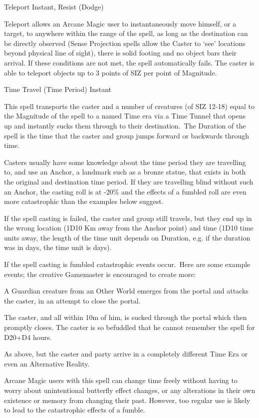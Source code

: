 \begin{rpg-spell}
{Teleport}
{Instant, Resist (Dodge)}

Teleport allows an Arcane Magic user to instantaneously move himself, or a target, to anywhere within the range of the spell, as long as the destination can be directly observed (Sense Projection spells allow the Caster to ‘see’ locations beyond physical line of sight), there is solid footing and no object bars their arrival. If these conditions are not met, the spell automatically fails. The caster is able to teleport objects up to 3 points of SIZ per point of Magnitude.
\end{rpg-spell}


\begin{rpg-spell}
{Time Travel (Time Period)}
{Instant}

This spell transports the caster and a number of creatures (of SIZ 12-18) equal to the Magnitude of the spell to a named Time era via a Time Tunnel that opens up and instantly sucks them through to their destination. The Duration of the spell is the time that the caster and group jumps forward or backwards through time. 

Casters usually have some knowledge about the time period they are travelling to, and use an Anchor, a landmark such as a bronze statue, that exists in both the original and destination time period. If they are travelling blind without such an Anchor, the casting roll is at -20\% and the effects of a fumbled roll are even more catastrophic than the examples below suggest. 

If the spell casting is failed, the caster and group still travels, but they end up in the wrong location (1D10 Km away from the Anchor point) and time (1D10 time units away, the length of the time unit depends on Duration, e.g. if the duration was in days, the time unit is days).

If the spell casting is fumbled catastrophic events occur. Here are some example events; the creative Gamemaster is encouraged to create more:
\begin{rpg-list}
\item A Guardian creature from an Other World emerges from the portal and attacks the caster, in an attempt to close the portal. 
\item The caster, and all within 10m of him, is sucked through the portal which then promptly closes. The caster is so befuddled that he cannot remember the spell for D20+D4 hours. 
\item As above, but the caster and party arrive in a completely different Time Era or even an Alternative Reality.
\end{rpg-list}

Arcane Magic users with this spell can change time freely without having to worry about unintentional butterfly effect changes, or any alterations in their own existence or memory from changing their past. However, too regular use is likely to lead to the catastrophic effects of a fumble.
\end{rpg-spell}
